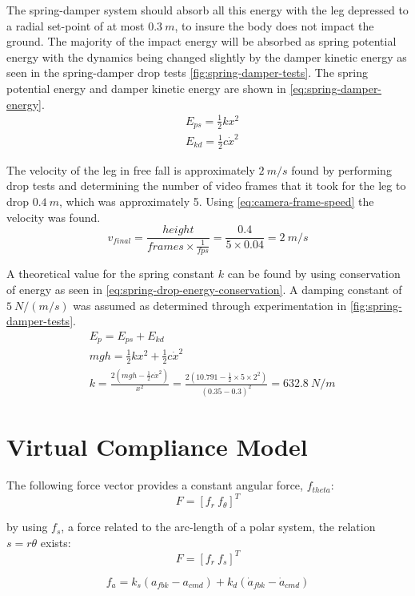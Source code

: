 The spring-damper system should absorb all this energy with the leg depressed to a radial set-point of at most $0.3\ m$, to insure the body does not impact the ground. The majority of the impact energy will be absorbed as spring potential energy with the dynamics being changed slightly by the damper kinetic energy as seen in the spring-damper drop tests \cref{fig:spring-damper-tests}. The spring potential energy and damper kinetic energy are shown in \cref{eq:spring-damper-energy}.
\begin{equation} \label{eq:spring-damper-energy}
\begin{aligned}
&E_{ps} = \frac{1}{2}kx^2 \\
&E_{kd} = \frac{1}{2}c\dot{x}^2
\end{aligned}
\end{equation}

The velocity of the leg in free fall is approximately $2\ m/s$ found by performing drop tests and determining the number of video frames that it took for the leg to drop $0.4\ m$, which was approximately 5. Using \cref{eq:camera-frame-speed} the velocity was found.
\begin{equation} \label{eq:camera-frame-speed}
v_{final} = \frac{height}{frames \times \frac{1}{fps}} = \frac{0.4}{5 \times 0.04} = 2\ m/s
\end{equation}

A theoretical value for the spring constant $k$ can be found by using conservation of energy as seen in \cref{eq:spring-drop-energy-conservation}. A damping constant of $5\ N/(m/s)$ was assumed as determined through experimentation in \cref{fig:spring-damper-tests}.
\begin{equation} \label{eq:spring-drop-energy-conservation}
\begin{aligned}
&E_p = E_{ps} + E_{kd} \\
&mgh = \frac{1}{2}kx^2 + \frac{1}{2}c\dot{x}^2\\
&k = \frac{2(mgh - \frac{1}{2}c\dot{x}^2)}{x^2} = \frac{2(10.791 - \frac{1}{2}\times 5\times 2^2)}{(0.35-0.3)^2} = 632.8\ N/m
\end{aligned}
\end{equation}

\section{Virtual Compliance Model}

The following force vector provides a constant angular force, $f_{theta}$:
\begin{equation}
F = [f_r\ f_{\theta}]^T
\end{equation}

by using $f_{s}$, a force related to the arc-length of a polar system, the relation $s = r \theta$ exists:
\begin{equation}
F = [f_r\ f_{s}]^T
\end{equation}

\begin{equation}
f_a = k_s(a_{fbk} - a_{cmd}) + k_d(\dot{a}_{fbk} - \dot{a}_{cmd})
\end{equation}